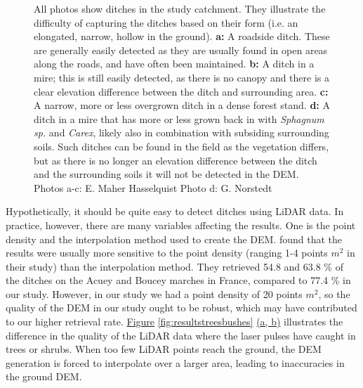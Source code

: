 \documentclass[]{interact}
\theoremstyle{plain}%
\theoremstyle{definition}
\theoremstyle{remark}
\begin{document}
\begin{figure} [!htb]
    \caption{All photos show ditches in the study catchment. They illustrate the difficulty of capturing the ditches based on their form (i.e. an elongated, narrow, hollow in the ground). \textbf{a: }A roadside ditch. These are generally easily detected as they are usually found in open areas along the roads, and have often been maintained. \textbf{b: }A ditch in a mire; this is still easily detected, as there is no canopy and there is a clear elevation difference between the ditch and surrounding area. \textbf{c: }A narrow, more or less  overgrown ditch in a dense forest stand. \textbf{d: }A ditch in a mire that has more or less grown back in with \textit{Sphagnum sp.} and \textit{Carex}, likely also in combination with subsiding surrounding soils. Such ditches can be found in the field as the vegetation differs, but as there is no longer an elevation difference between the ditch and the surrounding soils it will not be detected in the DEM. Photos a-c: E. Maher Hasselquist  Photo d: G. Norstedt}
    \label{fig:ditchpictures}
\end{figure}

Hypothetically, it should be quite easy to detect ditches using LiDAR data. In practice, however, there are many variables affecting the results. One is the point density and the interpolation method used to create the DEM. \citet{rapinel} found that the results were usually more sensitive to the point density (ranging 1-4 points $m^{2}$ in their study) than the interpolation method. They retrieved 54.8 and 63.8 \% of the ditches on the Acuey and Boucey marches in France, compared to 77.4 \% in our study. However, in our study we had a point density of 20 points $m^{2}$, so the quality of the DEM in our study ought to be robust, which may have contributed to our higher retrieval rate. \hyperref[fig:resultstreesbushes]{Figure} \ref{fig:resultstreesbushes} \hyperref[fig:resultstreesbushes]{(a, b)} illustrates the difference in the quality of the LiDAR data where the laser pulses have caught in trees or shrubs. When too few LiDAR points reach the ground, the DEM generation is forced to interpolate over a larger area, leading to inaccuracies in the ground DEM.
\end{document}

